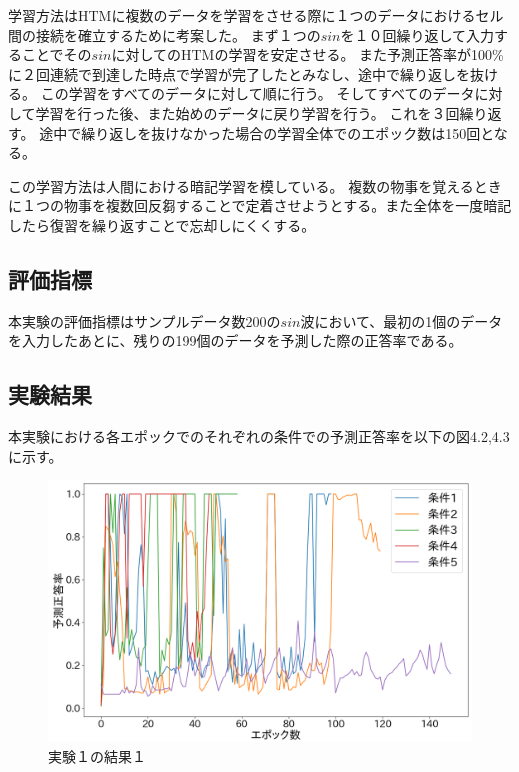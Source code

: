 学習方法はHTMに複数のデータを学習をさせる際に１つのデータにおけるセル間の接続を確立するために考案した。
まず１つの$sin$を１０回繰り返して入力することでその$sin$に対してのHTMの学習を安定させる。
また予測正答率が100\%に２回連続で到達した時点で学習が完了したとみなし、途中で繰り返しを抜ける。
この学習をすべてのデータに対して順に行う。
そしてすべてのデータに対して学習を行った後、また始めのデータに戻り学習を行う。
これを３回繰り返す。
途中で繰り返しを抜けなかった場合の学習全体でのエポック数は150回となる。

この学習方法は人間における暗記学習を模している。
複数の物事を覚えるときに１つの物事を複数回反芻することで定着させようとする。また全体を一度暗記したら復習を繰り返すことで忘却しにくくする。

\subsection{評価指標}
本実験の評価指標はサンプルデータ数200の$sin$波において、最初の1個のデータを入力したあとに、残りの199個のデータを予測した際の正答率である。

\subsection{実験結果}
本実験における各エポックでのそれぞれの条件での予測正答率を以下の図4.2,4.3に示す。

\begin{figure}[ht]
  \begin{center}
    \includegraphics[width=12cm]{./fig/experiment1}
    \caption{実験１の結果１}
    \label{fig:experiment1-1}
  \end{center}
\end{figure}

